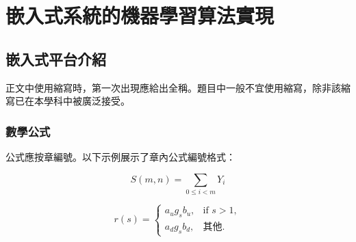 \chapter{嵌入式系統的機器學習算法實現}

\section{嵌入式平台介紹}
正文中使用縮寫時，第一次出現應給出全稱。題目中一般不宜使用縮寫，除非該縮寫已在本學科中被廣泛接受。

\subsection{數學公式}
公式應按章編號。以下示例展示了章內公式編號格式：

\begin{equation}
S(m,n)=\sum_{0\leq i<m}Y_i
\label{eq:sequence-sum}
\end{equation}

\begin{equation}
r(s)=
\begin{cases}
a_u g_s b_u, & \text{if } s>1,\\
a_d g_s b_d, & \text{其他}.
\end{cases}
\label{eq:piecewise}
\end{equation}
